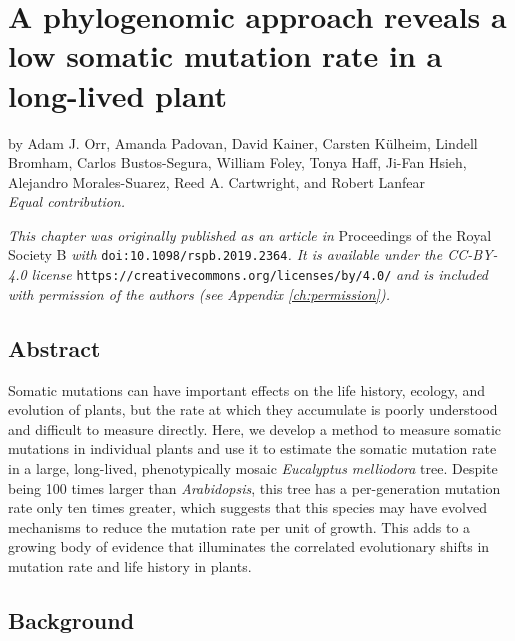 \chapter{A phylogenomic approach reveals a low somatic mutation rate in a long-lived plant}
\label{ch:phylogenomic}

\parindent0pt by Adam J. Orr\textsuperscript{\dagger}, Amanda Padovan\textsuperscript{\dagger}, David Kainer\textsuperscript{\dagger}, Carsten Külheim, Lindell Bromham, Carlos Bustos-Segura, William Foley, Tonya Haff, Ji-Fan Hsieh, Alejandro Morales-Suarez, Reed A. Cartwright, and Robert Lanfear
\\
\hspace*{\fill}\textit{\dagger Equal contribution.}

\vspace{\baselineskip}

\textit{This chapter was originally published as an article in} Proceedings of the Royal Society B \textit{with }\texttt{doi:10.1098/rspb.2019.2364}\textit{. It is available under the CC-BY-4.0 license }\texttt{https://creativecommons.org/licenses/by/4.0/}\textit{ and is included with permission of the authors (see Appendix \ref{ch:permission}).}

\section{Abstract}
Somatic mutations can have important effects on the life history, ecology, and evolution of plants, but the rate at which they accumulate is poorly understood and difficult to measure directly. Here, we develop a method to measure somatic mutations in individual plants and use it to estimate the somatic mutation rate in a large, long-lived, phenotypically mosaic \textit{Eucalyptus melliodora} tree. Despite being 100 times larger than \textit{Arabidopsis}, this tree has a per-generation mutation rate only ten times greater, which suggests that this species may have evolved mechanisms to reduce the mutation rate per unit of growth. This adds to a growing body of evidence that illuminates the correlated evolutionary shifts in mutation rate and life history in plants.

\section{Background}

